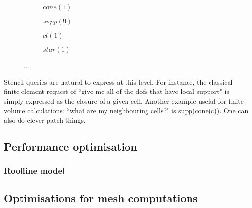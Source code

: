 
\begin{figure}
  \centering
  \begin{subfigure}{0.45\textwidth}
    \centering
    \caption{$cone(1)$}
  \end{subfigure}
  \begin{subfigure}{0.45\textwidth}
    \centering
    \caption{$supp(9)$}
  \end{subfigure}
  \begin{subfigure}{0.45\textwidth}
    \centering
    \caption{$cl(1)$}
  \end{subfigure}
  \begin{subfigure}{0.45\textwidth}
    \centering
    \caption{$star(1)$}
  \end{subfigure}

  \caption{...}
  \label{fig:plex_restrictions}
\end{figure}


Stencil queries are natural to express at this level.
For instance, the classical finite element request of ``give me all of the \glspl{dof} that have local support" is simply expressed as the closure of a given cell.
Another example useful for finite volume calculations: ``what are my neighbouring cells?" is supp(cone(c)).
One can also do clever patch things.


\subsection{Performance optimisation}

\subsubsection{Roofline model}

\begin{figure}
  
\end{figure}

\subsection{Optimisations for mesh computations}
